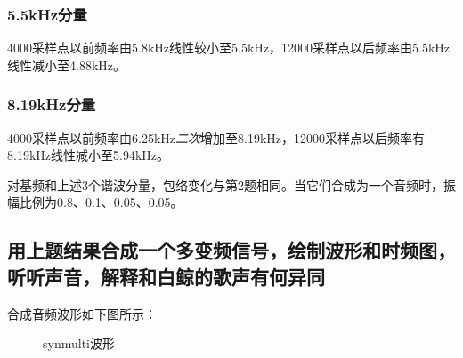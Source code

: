 \documentclass{article}
\begin{document}
            \subsubsection*{5.5kHz分量}
                4000采样点以前频率由5.8kHz线性较小至5.5kHz，12000采样点以后频率由5.5kHz线性减小至4.88kHz。
            \subsubsection*{8.19kHz分量}
                4000采样点以前频率由6.25kHz\emph{二次}增加至8.19kHz，12000采样点以后频率有8.19kHz线性减小至5.94kHz。

            对基频和上述3个谐波分量，包络变化与第2题相同。当它们合成为一个音频时，振幅比例为0.8、0.1、0.05、0.05。

        \subsection{用上题结果合成一个多变频信号，绘制波形和时频图，听听声音，解释和白鲸的歌声有何异同}
            合成音频波形如下图所示：
            \begin{figure}[htb]
                \centering
                \hspace{10pt}
                \caption{synmulti波形}
                \label{fig:synmulti}
            \end{figure}
\end{document}
